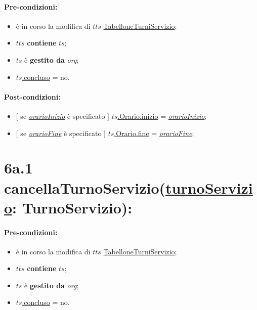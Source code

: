 \paragraph{Pre-condizioni:}
\begin{itemize}
 \item è in corso la modifica di $tts$ \underline{TabelloneTurniServizio};
    \item $tts$ \textbf{contiene} $ts$;
   \item $ts$ è \textbf{gestito da} {\textit{org}};
   \item \underline{$ts$.concluso} = no.
\end{itemize}

\paragraph{Post-condizioni:}

\begin{itemize}
    \item $[$ se \underline{\textit{orarioInizio}} è specificato $]$ \underline{$ts$.Orario.inizio} = \underline{\textit{orarioInizio}};
    \item $[$ se \underline{\textit{orarioFine}} è specificato $]$ \underline{$ts$.Orario.fine} = \underline{\textit{orarioFine}};
\end{itemize}

\section*{6a.1 cancellaTurnoServizio(\underline{turnoServizio}: TurnoServizio):}

\paragraph{Pre-condizioni:}
\begin{itemize}
 \item è in corso la modifica di $tts$ \underline{TabelloneTurniServizio};
    \item $tts$ \textbf{contiene} $ts$;
   \item $ts$ è \textbf{gestito da} {\textit{org}};
   \item \underline{$ts$.concluso} = no.
\end{itemize}

